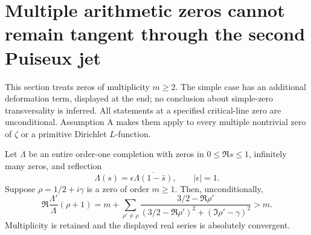 \section{Multiple arithmetic zeros cannot remain tangent through the second Puiseux jet}
\label{sec:analytic-multiple-zero-bending}

This section treats zeros of multiplicity $m\ge2$. The simple
case has an additional deformation term, displayed at the end;
no conclusion about simple-zero transversality is inferred.
All statements at a specified critical-line zero are
unconditional. Assumption A makes them apply to every multiple
nontrivial zero of $\zeta$ or a primitive Dirichlet $L$-function.

\begin{lemma}
\label{lem:analytic-reflected-logderivative}
Let $\Lambda$ be an entire order-one completion with zeros in
$0\le\Re s\le1$, infinitely many zeros, and reflection
\[
 \Lambda(s)=\epsilon\overline{\Lambda(1-\bar s)},
 \qquad |\epsilon|=1.
\]
Suppose $\rho=1/2+i\gamma$ is a zero of order $m\ge1$.
Then, unconditionally,
\begin{equation}\label{eq:analytic-reflected-positive}
 \Re\frac{\Lambda'}{\Lambda}(\rho+1)
   =m+\sum_{\rho'\ne\rho}
       \frac{3/2-\Re\rho'}
       {(3/2-\Re\rho')^2+(\Im\rho'-\gamma)^2}>m.
\end{equation}
Multiplicity is retained and the displayed real series is
absolutely convergent.
\end{lemma}

